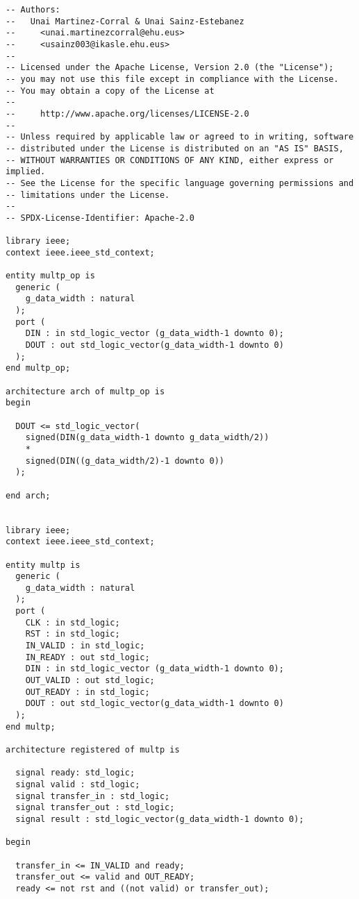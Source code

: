 \begin{code}
\begin{verbatim}
-- Authors:
--   Unai Martinez-Corral & Unai Sainz-Estebanez
--     <unai.martinezcorral@ehu.eus>
--     <usainz003@ikasle.ehu.eus>
--
-- Licensed under the Apache License, Version 2.0 (the "License");
-- you may not use this file except in compliance with the License.
-- You may obtain a copy of the License at
--
--     http://www.apache.org/licenses/LICENSE-2.0
--
-- Unless required by applicable law or agreed to in writing, software
-- distributed under the License is distributed on an "AS IS" BASIS,
-- WITHOUT WARRANTIES OR CONDITIONS OF ANY KIND, either express or implied.
-- See the License for the specific language governing permissions and
-- limitations under the License.
--
-- SPDX-License-Identifier: Apache-2.0

library ieee;
context ieee.ieee_std_context;

entity multp_op is
  generic (
    g_data_width : natural
  );
  port (
    DIN : in std_logic_vector (g_data_width-1 downto 0);
    DOUT : out std_logic_vector(g_data_width-1 downto 0)
  );
end multp_op;

architecture arch of multp_op is
begin

  DOUT <= std_logic_vector(
    signed(DIN(g_data_width-1 downto g_data_width/2))
    *
    signed(DIN((g_data_width/2)-1 downto 0))
  );

end arch;


library ieee;
context ieee.ieee_std_context;

entity multp is
  generic (
    g_data_width : natural
  );
  port (
    CLK : in std_logic;
    RST : in std_logic;
    IN_VALID : in std_logic;
    IN_READY : out std_logic;
    DIN : in std_logic_vector (g_data_width-1 downto 0);
    OUT_VALID : out std_logic;
    OUT_READY : in std_logic;
    DOUT : out std_logic_vector(g_data_width-1 downto 0)
  );
end multp;

architecture registered of multp is

  signal ready: std_logic;
  signal valid : std_logic;
  signal transfer_in : std_logic;
  signal transfer_out : std_logic;
  signal result : std_logic_vector(g_data_width-1 downto 0);

begin

  transfer_in <= IN_VALID and ready;
  transfer_out <= valid and OUT_READY;
  ready <= not rst and ((not valid) or transfer_out);


\end{verbatim}
\end{code}
